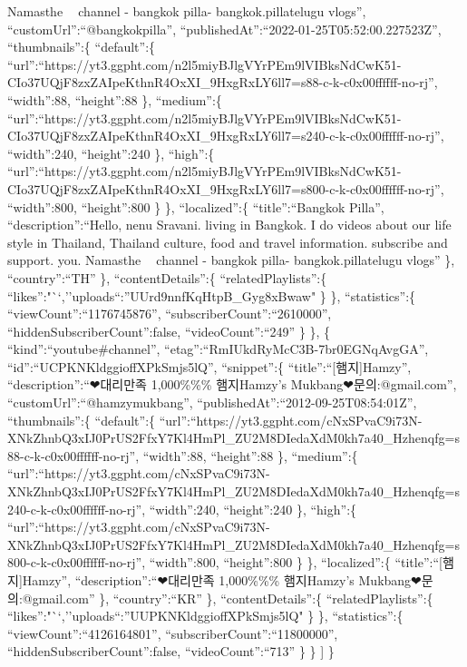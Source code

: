 \documentclass[11pt]{article}
\begin{document}
Namasthe 🙏🙏 \n\nyoutube channel - bangkok pilla\ninstagram -
bangkok.pilla\n\nBangkok telugu vlogs'',
``customUrl'':``@bangkokpilla'',
``publishedAt'':``2022-01-25T05:52:00.227523Z'', ``thumbnails'':\{
``default'':\{
``url'':``https://yt3.ggpht.com/n2l5miyBJlgVYrPEm9lVIBksNdCwK51-CIo37UQjF8zxZAIpeKthnR4OxXI\_9HxgRxLY6ll7=s88-c-k-c0x00ffffff-no-rj'',
``width'':88, ``height'':88 \}, ``medium'':\{
``url'':``https://yt3.ggpht.com/n2l5miyBJlgVYrPEm9lVIBksNdCwK51-CIo37UQjF8zxZAIpeKthnR4OxXI\_9HxgRxLY6ll7=s240-c-k-c0x00ffffff-no-rj'',
``width'':240, ``height'':240 \}, ``high'':\{
``url'':``https://yt3.ggpht.com/n2l5miyBJlgVYrPEm9lVIBksNdCwK51-CIo37UQjF8zxZAIpeKthnR4OxXI\_9HxgRxLY6ll7=s800-c-k-c0x00ffffff-no-rj'',
``width'':800, ``height'':800 \} \}, ``localized'':\{
``title'':``Bangkok Pilla'', ``description'':``Hello, nenu Sravani.
living in Bangkok. I do videos about our life style in Thailand,
Thailand culture, food and travel information. \nPlease subscribe and
support. \nthank you. Namasthe 🙏🙏 \n\nyoutube channel - bangkok
pilla\ninstagram - bangkok.pilla\n\nBangkok telugu vlogs'' \},
``country'':``TH'' \}, ``contentDetails'':\{ ``relatedPlaylists'':\{
``likes'':"``,''uploads``:''UUrd9nnfKqHtpB\_Gyg8xBwaw" \} \},
``statistics'':\{ ``viewCount'':``1176745876'',
``subscriberCount'':``2610000'', ``hiddenSubscriberCount'':false,
``videoCount'':``249'' \} \}, \{ ``kind'':``youtube\#channel'',
``etag'':``RmIUkdRyMcC3B-7br0EGNqAvgGA'',
``id'':``UCPKNKldggioffXPkSmjs5lQ'', ``snippet'':\{
``title'':``{[}햄지{]}Hamzy'', ``description'':``❤대리만족 1,000\%\%\%
햄지Hamzy's Mukbang❤\n{} 문의:@gmail.com\n'',
``customUrl'':``@hamzymukbang'',
``publishedAt'':``2012-09-25T08:54:01Z'', ``thumbnails'':\{
``default'':\{
``url'':``https://yt3.ggpht.com/cNxSPvaC9i73N-XNkZhnbQ3xIJ0PrUS2FfxY7Kl4HmPl\_ZU2M8DIedaXdM0kh7a40\_Hzhenqfg=s88-c-k-c0x00ffffff-no-rj'',
``width'':88, ``height'':88 \}, ``medium'':\{
``url'':``https://yt3.ggpht.com/cNxSPvaC9i73N-XNkZhnbQ3xIJ0PrUS2FfxY7Kl4HmPl\_ZU2M8DIedaXdM0kh7a40\_Hzhenqfg=s240-c-k-c0x00ffffff-no-rj'',
``width'':240, ``height'':240 \}, ``high'':\{
``url'':``https://yt3.ggpht.com/cNxSPvaC9i73N-XNkZhnbQ3xIJ0PrUS2FfxY7Kl4HmPl\_ZU2M8DIedaXdM0kh7a40\_Hzhenqfg=s800-c-k-c0x00ffffff-no-rj'',
``width'':800, ``height'':800 \} \}, ``localized'':\{
``title'':``{[}햄지{]}Hamzy'', ``description'':``❤대리만족 1,000\%\%\%
햄지Hamzy's Mukbang❤\n{} 문의:@gmail.com\n'' \},
``country'':``KR'' \}, ``contentDetails'':\{ ``relatedPlaylists'':\{
``likes'':"``,''uploads``:''UUPKNKldggioffXPkSmjs5lQ" \} \},
``statistics'':\{ ``viewCount'':``4126164801'',
``subscriberCount'':``11800000'', ``hiddenSubscriberCount'':false,
``videoCount'':``713'' \} \} {]} \}
\end{document}
